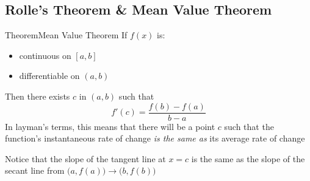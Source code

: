 \documentclass{MathNotes}
\newenvironment{theorem}[1]{\begin{GrayBox}{Theorem}{#1}}{\end{GrayBox}}
\begin{document}
\subsection{Rolle's Theorem \& Mean Value Theorem}
\begin{multicols}{2}
\begin{theorem}{Mean Value Theorem}
    If $f(x)$ is:
    \begin{itemize}
        \item continuous on $[a, b]$
        \item differentiable on $(a, b)$
    \end{itemize}
    Then there exists $c$ in $(a, b)$ such that 
    $$f'(c)=\frac{f(b)-f(a)}{b - a}$$ In layman's terms, this
    means that there will be a point $c$ such that the function's instantaneous
    rate of change \textit{ is the same as} its average rate of change
\end{theorem}

\begin{center}
\end{center}

Notice that the slope of the tangent line at $x=c$ is the same as the slope
of the secant line from $\big(a, f(a)\big)\to\big(b,f(b)\big)$
\end{multicols}
\end{document}
